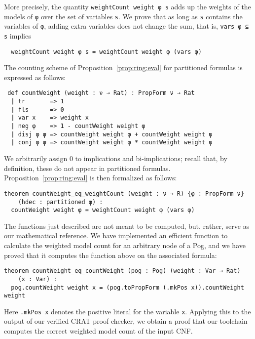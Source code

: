 More precisely, the quantity \lstinline{weightCount weight φ s} adds up the weights of the models
of \lstinline{φ} over the set of variables \lstinline{s}. We prove that as long as \lstinline{s}
contains the variables of \lstinline{φ}, adding extra variables does not change the sum, that is, \lstinline{vars φ ⊆ s} implies
\begin{lstlisting}
  weightCount weight φ s = weightCount weight φ (vars φ)
\end{lstlisting}
The counting scheme of Proposition~\ref{prop:ring:eval} for partitioned formulas is expressed as follows:
\begin{lstlisting}
 def countWeight (weight : ν → Rat) : PropForm ν → Rat
  | tr       => 1
  | fls      => 0
  | var x    => weight x
  | neg φ    => 1 - countWeight weight φ
  | disj φ ψ => countWeight weight φ + countWeight weight ψ
  | conj φ ψ => countWeight weight φ * countWeight weight ψ
\end{lstlisting}
We arbitrarily assign 0 to implications and bi-implications;
recall that, by definition, these do not appear in partitioned formulas.
Proposition~\ref{prop:ring:eval} is then formalized as follows:
\begin{lstlisting}
theorem countWeight_eq_weightCount (weight : ν → R) {φ : PropForm ν}
    (hdec : partitioned φ) :
  countWeight weight φ = weightCount weight φ (vars φ)
\end{lstlisting}

The functions just described are not meant to be computed, but,
rather, serve as our mathematical reference.
We have implemented an efficient function to calculate the weighted model count
for an arbitrary node of a Pog, and we have proved that it computes the function above on the
associated formula:
\begin{lstlisting}
theorem countWeight_eq_countWeight (pog : Pog) (weight : Var → Rat)
    (x : Var) :
  pog.countWeight weight x = (pog.toPropForm (.mkPos x)).countWeight weight
\end{lstlisting}
Here \lstinline{.mkPos x} denotes the positive literal for the variable \lstinline{x}.
Applying this to the output of our verified CRAT proof checker,
we obtain a proof that
our toolchain computes the correct weighted model count of the input CNF.

